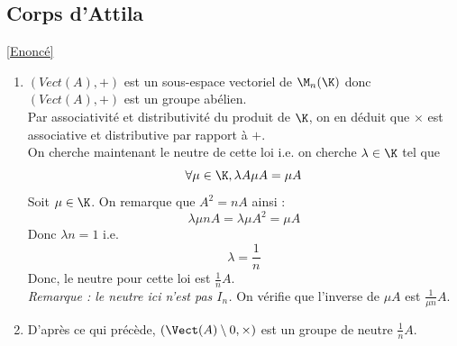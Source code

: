 \documentclass[8pt]{book}
\begin{document}
	\subsection{Corps d'Attila}
	\label{Corps d'Attila corrigé}
	\textcolor{blue}{\hyperref[Corps d'Attila]{[Enoncé]}}\\
	\begin{enumerate}
		\item $(Vect(A),+)$ est un sous-espace vectoriel de $\M_n(\K)$ donc $(Vect(A),+)$ est un groupe abélien.\\
		Par associativité et distributivité du produit de $\K$, on en déduit que $\times$ est associative et distributive par rapport à $+$.\\
		On cherche maintenant le neutre de cette loi i.e. on cherche $\lambda\in\K$ tel que \[\forall \mu\in \K, \lambda A\mu A=\mu A\]
		Soit $\mu\in \K$.
		On remarque que $A^2=nA$ ainsi :
		\[\lambda\mu n A=\lambda \mu A^2=\mu A\]
		Donc $\lambda n=1$ i.e. \[\lambda=\frac{1}{n}\]
		Donc, le neutre pour cette loi est $\displaystyle\frac{1}{n} A$.\\
		\textit{Remarque : le neutre ici n'est pas $I_n$.}
		On vérifie que l'inverse de $\mu A$ est $\displaystyle \frac{1}{\mu n} A$.
		\item D'après ce qui précède, $(\Vect(A)\setminus{0},\times)$ est un groupe de neutre $\displaystyle\frac{1}{n}A$.
	\end{enumerate}
\end{document}
